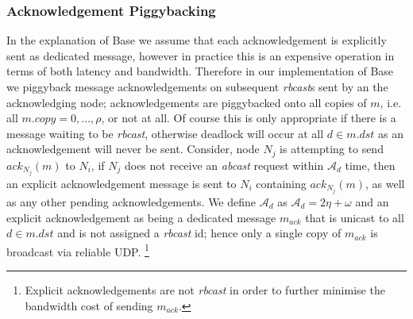     \subsubsection*{Acknowledgement Piggybacking}\label{ssec:base_ack_piggyback}
    In the explanation of \textsf{Base} we assume that each acknowledgement is explicitly sent as dedicated message, however in practice this is an expensive operation in terms of both latency and bandwidth.  Therefore in our implementation of \textsf{Base} we piggyback message acknowledgements on subsequent \emph{rbcast}s sent by an the acknowledging node; acknowledgements are piggybacked onto all copies of $m$, i.e. all $m.copy =0,\ldots,\rho$, or not at all.  Of course this is only appropriate if there is a message waiting to be \emph{rbcast}, otherwise deadlock will occur at all $d \in m.dst$ as an acknowledgement will never be sent.  Consider, node $N_j$ is attempting to send $ack_{N_j}(m)$ to $N_i$, if $N_j$ does not receive an \emph{abcast} request within $\mathcal{A}_d$ time, then an explicit acknowledgement message is sent to $N_i$ containing $ack_{N_j}(m)$, as well as any other pending acknowledgements.  We define $\mathcal{A}_d$ as $\mathcal{A}_d = 2\eta + \omega$ and an explicit acknowledgement as being a dedicated message $m_{ack}$ that is unicast to all $d \in m.dst$ and is not assigned a \emph{rbcast} id; hence only a single copy of $m_{ack}$ is broadcast via reliable UDP.  \footnote{Explicit acknowledgements are not \emph{rbcast} in order to further minimise the bandwidth cost of sending $m_{ack}$.}
    
%    

